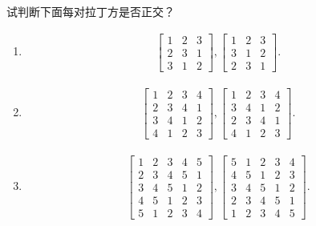 试判断下面每对拉丁方是否正交？
\begin{enumerate}
    \item 
    \begin{align*}
        \left[\begin{matrix}
            1&2&3\\
            2&3&1\\
            3&1&2
        \end{matrix}\right],
        \left[\begin{matrix}
            1&2&3\\
            3&1&2\\
            2&3&1
        \end{matrix}\right].
    \end{align*}
    \item 
    \begin{align*}
        \left[\begin{matrix}
            1&2&3&4\\
            2&3&4&1\\
            3&4&1&2\\
            4&1&2&3
        \end{matrix}\right],
        \left[\begin{matrix}
            1&2&3&4\\
            3&4&1&2\\
            2&3&4&1\\
            4&1&2&3
        \end{matrix}\right].
    \end{align*}
    \item 
    \begin{align*}
        \left[\begin{matrix}
            1&2&3&4&5\\
            2&3&4&5&1\\
            3&4&5&1&2\\
            4&5&1&2&3\\
            5&1&2&3&4
        \end{matrix}\right],
        \left[\begin{matrix}
            5&1&2&3&4\\
            4&5&1&2&3\\
            3&4&5&1&2\\
            2&3&4&5&1\\
            1&2&3&4&5
        \end{matrix}\right].
    \end{align*}
\end{enumerate}